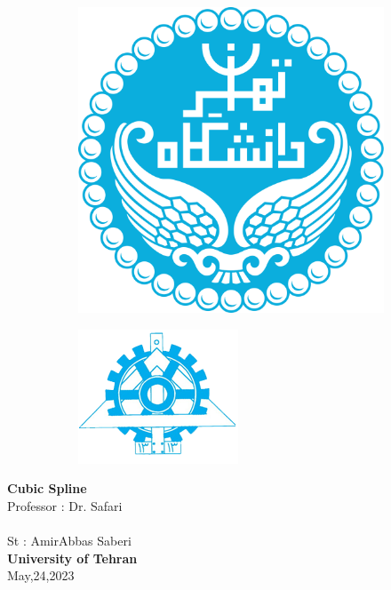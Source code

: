 \documentclass[12pt]{article}
\begin{document}
\begin{figure}[!tbp]
  \begin{subfigure}[b]{0.2 \textwidth}
    \includegraphics[width=\textwidth]{img/uni}
  \end{subfigure}
  \hfill
  \begin{subfigure}[b]{0.25\textwidth}
    \includegraphics[width=\textwidth]{img/fani}
  \end{subfigure}
\end{figure}
\begin{center}
\textbf{Cubic Spline} \\[1in]
Professor : Dr. Safari\\~\\
St : AmirAbbas Saberi
\\[4in]
\textbf{University of Tehran}\\
May,24,2023
\end{center}
	\thispagestyle{firstpage}
\newpage
\end{document}
